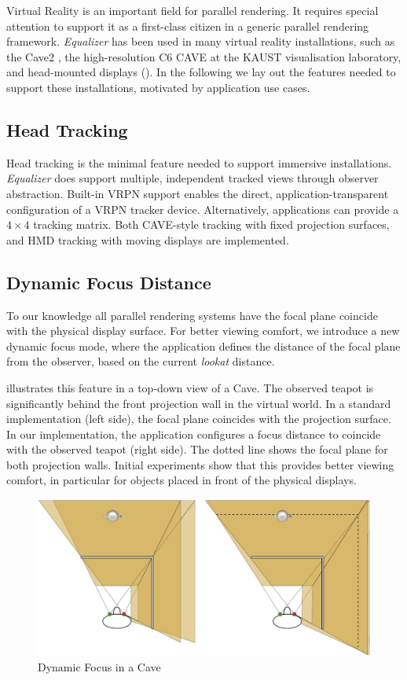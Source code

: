 Virtual Reality is an important field for parallel rendering. It requires
special attention to support it as a first-class citizen in a generic parallel
rendering framework. {\em Equalizer} has been used in many virtual reality
installations, such as the Cave2 \cite{FNTTL:13}, the high-resolution C6 CAVE
at the KAUST visualisation laboratory, and head-mounted displays
(). In the following we lay out the features needed to support
these installations, motivated by application use cases.

\subsection{Head Tracking}

Head tracking is the minimal feature needed to support immersive installations.
{\em Equalizer} does support multiple, independent tracked views through
observer abstraction. Built-in VRPN support enables the direct,
application-transparent configuration of a VRPN tracker device. Alternatively,
applications can provide a $4\times 4$ tracking matrix. Both CAVE-style tracking
with fixed projection surfaces, and HMD tracking with moving displays are
implemented.

\subsection{Dynamic Focus Distance}

To our knowledge all parallel rendering systems have the focal plane coincide
with the physical display surface. For better viewing comfort, we introduce a
new dynamic focus mode, where the application defines the distance of the focal
plane from the observer, based on the current \textit{lookat} distance.

 illustrates this feature in a top-down view of a Cave. The
observed teapot is significantly behind the front projection wall in the
virtual world. In a standard implementation (left side), the focal plane
coincides with the projection surface. In our implementation, the application
configures a focus distance to coincide with the observed teapot (right side).
The dotted line shows the focal plane for both projection walls. Initial
experiments show that this provides better viewing comfort, in particular for
objects placed in front of the physical displays.

\begin{figure}[h!t]\center
 \includegraphics[width=\textwidth]{images/focus}
 {\caption{\label{fFocus}Dynamic Focus in a Cave}}
\end{figure}

